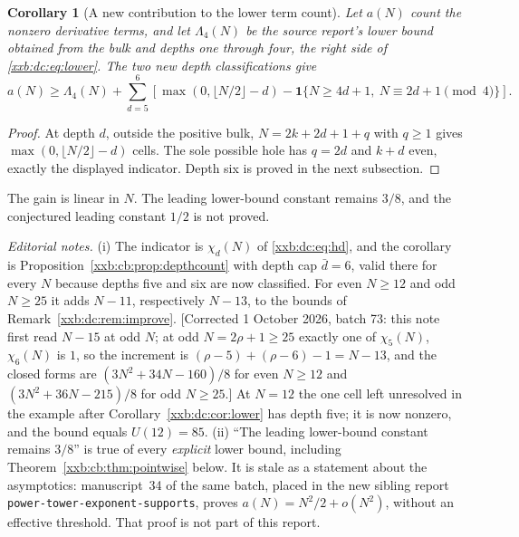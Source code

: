 \documentclass[11pt,a4paper]{article}
\numberwithin{equation}{section}
\newtheorem{corollary}[theorem]{Corollary}
\theoremstyle{definition}
\theoremstyle{remark}
\theoremstyle{plain}
\newcommand{\U}{U}
\begin{document}
\begin{corollary}[A new contribution to the lower term count]\label{xxb:d56:cor:count}
Let $a(N)$ count the nonzero derivative terms, and let $\Lambda_4(N)$ be the
source report's lower bound obtained from the bulk and depths one through four,
the right side of \eqref{xxb:dc:eq:lower}. The two new depth classifications
give
\[
 a(N)\ge\Lambda_4(N)+\sum_{d=5}^{6}\left[\max(0,\lfloor N/2\rfloor-d)
 -\mathbf1\{N\ge4d+1,\ N\equiv2d+1\pmod4\}\right].
\]
\end{corollary}
\begin{proof}
At depth $d$, outside the positive bulk, $N=2k+2d+1+q$ with $q\ge1$ gives
$\max(0,\lfloor N/2\rfloor-d)$ cells. The sole possible hole has $q=2d$ and
$k+d$ even, exactly the displayed indicator. Depth six is proved in the next
subsection.
\end{proof}
The gain is linear in $N$. The leading lower-bound constant remains $3/8$, and
the conjectured leading constant $1/2$ is not proved.

\emph{Editorial notes.}  (i) The indicator is $\chi_d(N)$ of
\eqref{xxb:dc:eq:hd}, and the corollary is
Proposition~\ref{xxb:cb:prop:depthcount} with depth cap $\bar d=6$, valid there
for every $N$ because depths five and six are now classified.  For even
$N\ge12$ and odd $N\ge25$ it adds $N-11$, respectively $N-13$, to the bounds of
Remark~\ref{xxb:dc:rem:improve}.  [Corrected 1 October 2026, batch 73: this
note first read $N-15$ at odd $N$; at odd $N=2\rho+1\ge25$ exactly one of
$\chi_5(N)$, $\chi_6(N)$ is $1$, so the increment is $(\rho-5)+(\rho-6)-1=N-13$,
and the closed forms are $(3N^2+34N-160)/8$ for even $N\ge12$ and
$(3N^2+36N-215)/8$ for odd $N\ge25$.]  At $N=12$ the one cell left unresolved in the
example after Corollary~\ref{xxb:dc:cor:lower} has depth five; it is now
nonzero, and the bound equals $\U(12)=85$.
(ii) ``The leading lower-bound constant remains $3/8$'' is true of every
\emph{explicit} lower bound, including Theorem~\ref{xxb:cb:thm:pointwise}
below.  It is stale as a statement about the asymptotics: manuscript~34 of the
same batch, placed in the new sibling report
\texttt{power-tower-exponent-supports}, proves $a(N)=N^2/2+o(N^2)$, without
an effective threshold.  That proof is not part of this report.
\end{document}
